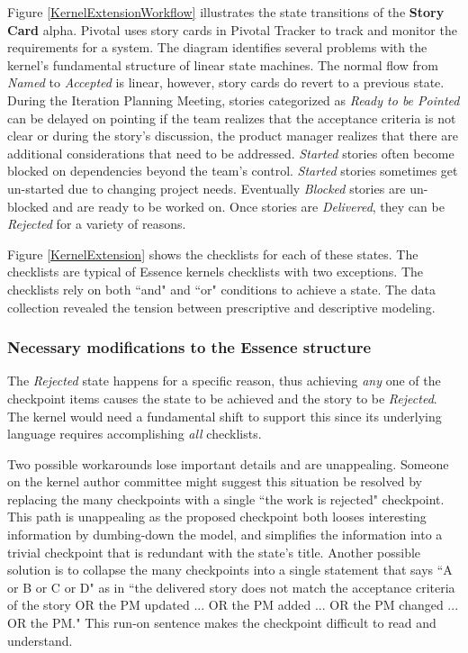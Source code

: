 \documentclass[preprint,12pt,3p]{elsarticle}
\begin{document}
Figure \ref{KernelExtensionWorkflow} illustrates the state transitions of the \textbf{Story Card} alpha. Pivotal uses story cards in Pivotal Tracker to track and monitor the requirements for a system. The diagram identifies several problems with the kernel's fundamental structure of linear state machines. The normal flow from \textit{Named} to \textit{Accepted} is linear, however, story cards do revert to a previous state. During the Iteration Planning Meeting, stories categorized as \textit{Ready to be Pointed} can be delayed on pointing if the team realizes that the acceptance criteria is not clear or during the story's discussion, the product manager realizes that there are additional considerations that need to be addressed. \textit{Started} stories often become blocked on dependencies beyond the team's control. \textit{Started} stories sometimes get un-started due to changing project needs. Eventually \textit{Blocked} stories are un-blocked and are ready to be worked on. Once stories are \textit{Delivered}, they can be \textit{Rejected} for a variety of reasons.

Figure \ref{KernelExtension} shows the checklists for each of these states. The checklists are typical of Essence kernels checklists with two exceptions. The checklists rely on both ``and" and  ``or" conditions to achieve a state. The data collection revealed the tension between prescriptive and descriptive modeling.

\subsubsection{Necessary modifications to the Essence structure}

The \textit{Rejected} state happens for a specific reason, thus achieving \textit{any} one of the checkpoint items causes the state to be achieved and the story to be \textit{Rejected}. The kernel would need a fundamental shift to support this since its underlying language requires accomplishing \textit{all} checklists. 

Two possible workarounds lose important details and are unappealing. Someone on the kernel author committee might suggest this situation be resolved by replacing the many checkpoints with a single ``the work is rejected" checkpoint. This path is unappealing as the proposed checkpoint both looses interesting information by dumbing-down the model, and simplifies the information into a trivial checkpoint that is redundant with the state's title. Another possible solution is to collapse the many checkpoints into a single statement that says ``A or B or C or D" as in ``the delivered story does not match the acceptance criteria of the story OR the PM updated ... OR the PM added ... OR the PM changed ... OR the PM." This run-on sentence makes the checkpoint difficult to read and understand. 
\end{document}
